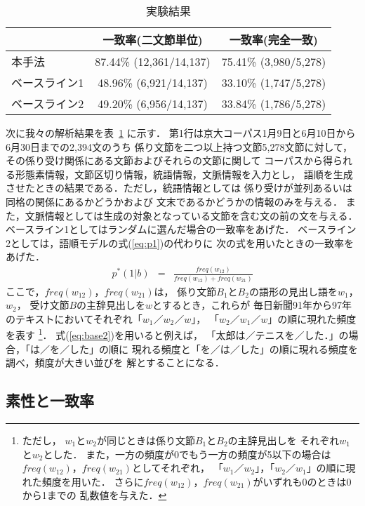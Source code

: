 \begin{table}[htb]
  \begin{center}
    \caption{実験結果}
    \label{Result} 
    \begin{tabular}{|l@{ }|c@{ }|c@{ }|}
      \hline
      & 一致率(二文節単位) & 一致率(完全一致)\\
      \hline      
      本手法 & 87.44\% (12,361/14,137) & 75.41\% (3,980/5,278)\\
      ベースライン1 & 48.96\% (6,921/14,137) & 33.10\% (1,747/5,278)\\
      ベースライン2 & 49.20\% (6,956/14,137) & 33.84\% (1,786/5,278)\\
      \hline
    \end{tabular}
  \end{center}
\end{table}
次に我々の解析結果を表~\ref{Result} に示す．
第1行は京大コーパス1月9日と6月10日から6月30日までの2,394文のうち
係り文節を二つ以上持つ文節5,278文節に対して，
その係り受け関係にある文節およびそれらの文節に関して
コーパスから得られる形態素情報，文節区切り情報，統語情報，文脈情報を入力とし，
語順を生成させたときの結果である．ただし，統語情報としては
係り受けが並列あるいは同格の関係にあるかどうかおよび
文末であるかどうかの情報のみを与える．
また，文脈情報としては生成の対象となっている文節を含む文の前の文を与える．
ベースライン1としてはランダムに選んだ場合の一致率をあげた．
ベースライン2としては，語順モデルの式(\ref{eq:p1})の代わりに
次の式を用いたときの一致率をあげた．
\begin{eqnarray}
  \label{eq:base2}
  p^{*}(1|b) & = & \frac{freq(w_{12})}{freq(w_{12})+freq(w_{21})}
\end{eqnarray}
ここで，$freq(w_{12})$，$freq(w_{21})$は，
係り文節$B_1$と$B_2$の語形の見出し語を$w_1$，$w_2$，
受け文節$B$の主辞見出しを$w$とするとき，これらが
毎日新聞91年から97年のテキストにおいてそれぞれ「$w_1$／$w_2$／$w$」，
「$w_2$／$w_1$／$w$」の順に現れた頻度を表す
\footnote{
  ただし，
  $w_1$と$w_2$が同じときは係り文節$B_1$と$B_2$の主辞見出しを
  それぞれ$w_1$と$w_2$とした．
  また，一方の頻度が0でもう一方の頻度が5以下の場合は
  $freq(w_{12})$，$freq(w_{21})$としてそれぞれ，
  「$w_1$／$w_2$」，「$w_2$／$w_1$」の順に現れた頻度を用いた．
  さらに$freq(w_{12})$，$freq(w_{21})$がいずれも0のときは0から1までの
  乱数値を与えた．
  }．
式(\ref{eq:base2})を用いると例えば，
「太郎は／テニスを／した．」の場合，「は／を／した」の順に
現れる頻度と「を／は／した」の順に現れる頻度を調べ，頻度が大きい並びを
解とすることになる．

\subsection{素性と一致率}
\label{sec:feature_and_accuracy}

